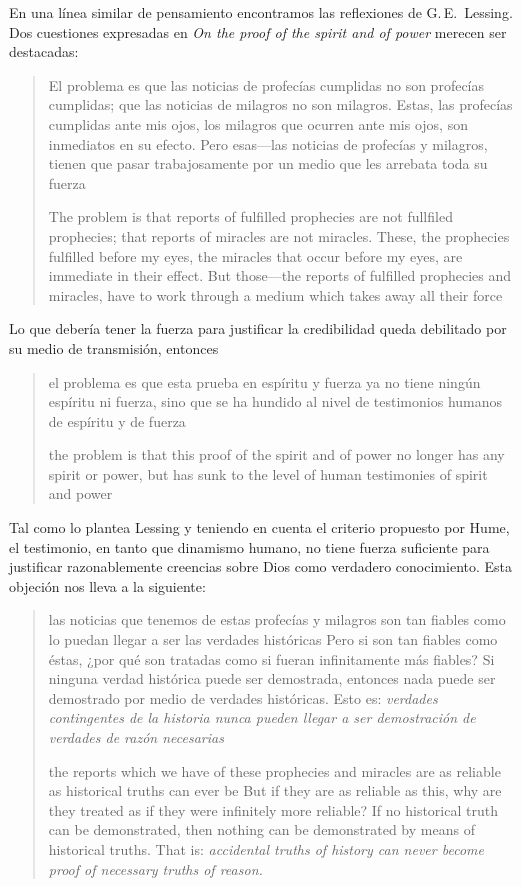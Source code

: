 En una línea similar de pensamiento encontramos las reflexiones de
G.\,E.~Lessing. Dos cuestiones expresadas en \emph{On the proof of the spirit
  and of power} merecen ser destacadas:

\blockquote[The problem is that reports of fulfilled prophecies are not
fullfiled prophecies; that reports of miracles are not miracles. These, the
prophecies fulfilled before my eyes, the miracles that occur before my eyes, are
immediate in their effect. But those---the reports of fulfilled prophecies and
miracles, have to work through a medium which takes away all their force]{El
  problema es que las noticias de profecías cumplidas no son profecías
  cumplidas; que las noticias de milagros no son milagros. Estas, las profecías
  cumplidas ante mis ojos, los milagros que ocurren ante mis ojos, son
  inmediatos en su efecto. Pero esas---las noticias de profecías y milagros,
  tienen que pasar trabajosamente por un medio que les arrebata toda su fuerza}

Lo que debería tener la fuerza para justificar la credibilidad queda debilitado
por su medio de transmisión, entonces
\blockquote[the problem is that this proof of the spirit and of power no longer
has any spirit or power, but has sunk to the level of human testimonies of
spirit and power]{el problema es que esta prueba en espíritu y fuerza ya no
  tiene ningún espíritu ni fuerza, sino que se ha hundido al nivel de
  testimonios humanos de espíritu y de fuerza}.

Tal como lo plantea Lessing y teniendo en cuenta el criterio propuesto por Hume,
el testimonio, en tanto que dinamismo humano, no tiene fuerza suficiente para
justificar razonablemente creencias sobre Dios como verdadero conocimiento. Esta
objeción nos lleva a la siguiente:
\blockquote[the reports which we have of these prophecies and miracles are as
reliable as historical truths can ever be \textelp{} But if they are as reliable
as this, why are they treated as if they were infinitely more reliable?
\textelp{} If no historical truth can be demonstrated, then nothing can be
demonstrated by means of historical truths. That is: \emph{accidental truths of
  history can never become proof of necessary truths of reason.}]{las noticias
  que tenemos de estas profecías y milagros son tan fiables como lo puedan
  llegar a ser las verdades históricas \textelp{} Pero si son tan fiables como
  éstas, ¿por qué son tratadas como si fueran infinitamente más fiables?
  \textelp{} Si ninguna verdad histórica puede ser demostrada, entonces nada
  puede ser demostrado por medio de verdades históricas. Esto es: \emph{verdades
    contingentes de la historia nunca pueden llegar a ser demostración de
    verdades de razón necesarias}}


